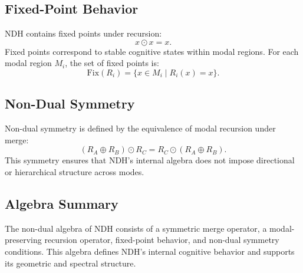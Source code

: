 \subsection{Fixed-Point Behavior}

NDH contains fixed points under recursion:
\[
x \odot x = x.
\]
Fixed points correspond to stable cognitive states within modal regions. For
each modal region $M_i$, the set of fixed points is:
\[
\text{Fix}(R_i) = \{ x \in M_i \mid R_i(x) = x \}.
\]

\subsection{Non-Dual Symmetry}

Non-dual symmetry is defined by the equivalence of modal recursion under merge:
\[
(R_A \oplus R_B) \odot R_C
  = R_C \odot (R_A \oplus R_B).
\]
This symmetry ensures that NDH's internal algebra does not impose directional or
hierarchical structure across modes.

\subsection{Algebra Summary}

The non-dual algebra of NDH consists of a symmetric merge operator, a
modal-preserving recursion operator, fixed-point behavior, and non-dual symmetry
conditions. This algebra defines NDH's internal cognitive behavior and supports
its geometric and spectral structure.
